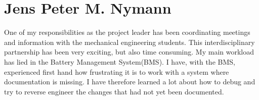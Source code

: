 \section{Jens Peter M. Nymann}
One of my responsibilities as the project leader has been coordinating meetings and information with the mechanical engineering students. This interdisciplinary partnership has been very exciting, but also time consuming. My main workload has lied in the Battery Management System(BMS). I have, with the BMS, experienced first hand how frustrating it is to work with a system where documentation is missing. I have therefore learned a lot about how to debug and try to reverse engineer the changes that had not yet been documented.